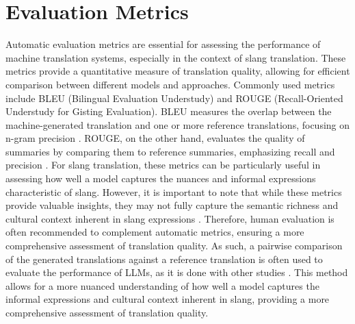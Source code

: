 \section{Evaluation Metrics}
Automatic evaluation metrics are essential for assessing the performance of machine translation systems, especially in the context of slang translation. These metrics provide a quantitative measure of translation quality, allowing for efficient comparison between different models and approaches. Commonly used metrics include BLEU (Bilingual Evaluation Understudy) and ROUGE (Recall-Oriented Understudy for Gisting Evaluation). BLEU measures the overlap between the machine-generated translation and one or more reference translations, focusing on n-gram precision \cite{papineni_roukos_ward_zhu_2001}. ROUGE, on the other hand, evaluates the quality of summaries by comparing them to reference summaries, emphasizing recall and precision \cite{lin_2004}. For slang translation, these metrics can be particularly useful in assessing how well a model captures the nuances and informal expressions characteristic of slang. However, it is important to note that while these metrics provide valuable insights, they may not fully capture the semantic richness and cultural context inherent in slang expressions \cite{liang2025slangditbenchmarkingllmsinterpretative}. Therefore, human evaluation is often recommended to complement automatic metrics, ensuring a more comprehensive assessment of translation quality. As such, a pairwise comparison of the generated translations against a reference translation is often used to evaluate the performance of LLMs, as it is done with other studies \cite{zhao2024loraland310finetuned}\cite{chiang2024chatbot}. This method allows for a more nuanced understanding of how well a model captures the informal expressions and cultural context inherent in slang, providing a more comprehensive assessment of translation quality.

